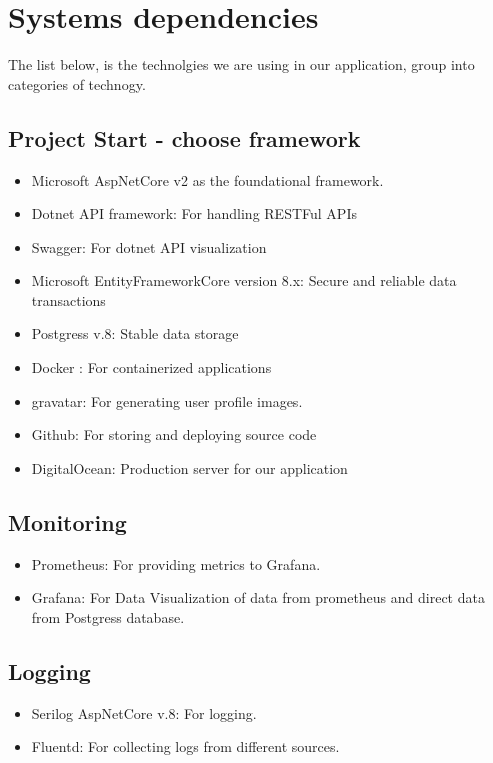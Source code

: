 \section{Systems dependencies}

The list below, is the technolgies we are using in our application, group into categories of technogy.

\subsection*{Project Start - choose framework}

\begin{itemize}
	\item Microsoft AspNetCore v2 as the foundational framework.
	\item Dotnet API framework: For handling RESTFul APIs
	\item Swagger: For dotnet API visualization
	\item Microsoft EntityFrameworkCore version 8.x: Secure and reliable data transactions
	\item Postgress v.8: Stable data storage
	\item Docker : For containerized applications
	\item gravatar: For generating user profile images.
	\item Github: For storing and deploying source code
	\item DigitalOcean: Production server for our application
\end{itemize}

\subsection*{Monitoring}

\begin{itemize}
	\item Prometheus: For providing metrics to Grafana.
	\item Grafana: For Data Visualization of data from prometheus and direct data from Postgress database.
\end{itemize}

\subsection*{Logging}

\begin{itemize}
	\item Serilog AspNetCore v.8: For logging.
	\item Fluentd: For collecting logs from different sources.
\end{itemize}


